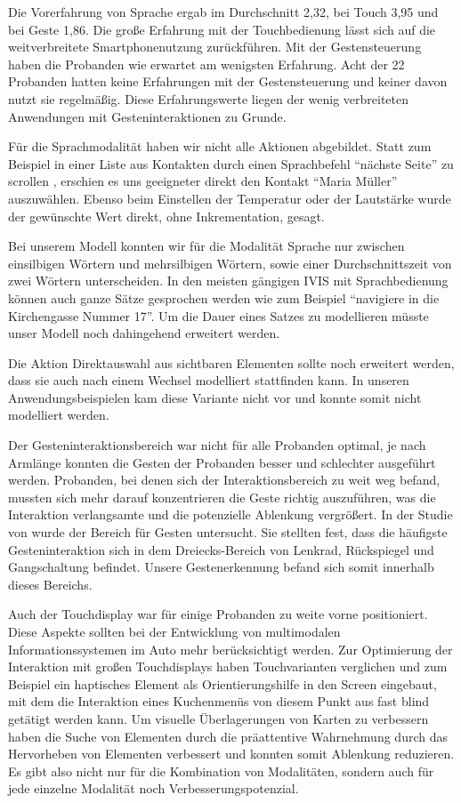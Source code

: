 Die Vorerfahrung von Sprache ergab im Durchschnitt 2,32, bei Touch 3,95 und bei Geste 1,86. Die große Erfahrung mit der Touchbedienung lässt sich auf die weitverbreitete Smartphonenutzung zurückführen. Mit der Gestensteuerung haben die Probanden wie erwartet am wenigsten Erfahrung. Acht der 22 Probanden hatten keine Erfahrungen mit der Gestensteuerung und keiner davon nutzt sie regelmäßig. Diese Erfahrungswerte liegen der wenig verbreiteten Anwendungen mit Gesteninteraktionen zu Grunde.

Für die Sprachmodalität haben wir nicht alle Aktionen abgebildet. 
Statt zum Beispiel in einer Liste aus Kontakten durch einen Sprachbefehl "`nächste Seite"' zu scrollen , erschien es uns geeigneter direkt den Kontakt "`Maria Müller"' auszuwählen. Ebenso beim Einstellen der Temperatur oder der Lautstärke wurde der gewünschte Wert direkt, ohne Inkrementation, gesagt.

Bei unserem Modell konnten wir für die Modalität Sprache nur zwischen einsilbigen Wörtern und mehrsilbigen Wörtern, sowie einer Durchschnittszeit von zwei Wörtern unterscheiden. In den meisten gängigen IVIS mit Sprachbedienung können auch ganze Sätze gesprochen werden wie zum Beispiel "`navigiere in die Kirchengasse Nummer 17"'. Um die Dauer eines Satzes zu modellieren müsste unser Modell noch dahingehend erweitert werden. 

Die Aktion Direktauswahl aus sichtbaren Elementen sollte noch erweitert werden, dass sie auch nach einem Wechsel modelliert stattfinden kann. In unseren Anwendungsbeispielen kam diese Variante nicht vor und konnte somit nicht modelliert werden.

Der Gesteninteraktionsbereich war nicht für alle Probanden optimal, je nach Armlänge konnten die Gesten der Probanden besser und schlechter ausgeführt werden. Probanden, bei denen sich der Interaktionsbereich zu weit weg befand, mussten sich mehr darauf konzentrieren die Geste richtig auszuführen, was die Interaktion verlangsamte und die potenzielle Ablenkung vergrößert. In der Studie von \citet{Riener:2013:SIG} wurde der Bereich für Gesten untersucht. 
Sie stellten fest, dass die häufigste Gesteninteraktion sich in dem Dreiecks-Bereich von Lenkrad, Rückspiegel und Gangschaltung befindet. 
Unsere Gestenerkennung befand sich somit innerhalb dieses Bereichs.

Auch der Touchdisplay war für einige Probanden zu weite vorne positioniert. Diese Aspekte sollten bei der Entwicklung von multimodalen Informationssystemen im Auto mehr berücksichtigt werden. Zur Optimierung der Interaktion mit großen Touchdisplays haben \citet{Rumelin:2013} Touchvarianten verglichen und zum Beispiel ein haptisches Element als Orientierungshilfe in den Screen eingebaut, mit dem die Interaktion eines Kuchenmenüs von diesem Punkt aus fast blind getätigt werden kann. Um visuelle Überlagerungen von Karten zu verbessern haben \citet{lee2013saliency} die Suche von Elementen durch die präattentive Wahrnehmung durch das Hervorheben von Elementen verbessert und konnten somit Ablenkung reduzieren. Es gibt also nicht nur für die Kombination von Modalitäten, sondern auch für jede einzelne Modalität noch Verbesserungspotenzial. 

